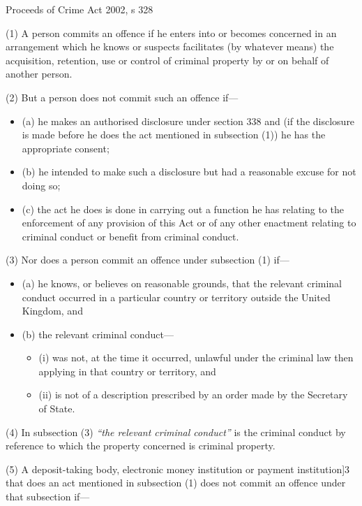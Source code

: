 \documentclass[
]{article}
\newenvironment{env-28b706cc-8a08-422f-af86-ede86c79505b}
{
    \savenotes\tcolorbox[blanker,breakable,left=5pt,borderline west={2pt}{-4pt}{green}]
}
{
    \endtcolorbox\spewnotes
}
\begin{document}
\begin{env-28b706cc-8a08-422f-af86-ede86c79505b}

Proceeds of Crime Act 2002, s 328

(1) A person commits an offence if he enters into or becomes concerned
in an arrangement which he knows or suspects facilitates (by whatever
means) the acquisition, retention, use or control of criminal property
by or on behalf of another person.

(2) But a person does not commit such an offence if---

\begin{itemize}
\item
  (a) he makes an authorised disclosure under section 338 and (if the
  disclosure is made before he does the act mentioned in subsection (1))
  he has the appropriate consent;
\item
  (b) he intended to make such a disclosure but had a reasonable excuse
  for not doing so;
\item
  (c) the act he does is done in carrying out a function he has relating
  to the enforcement of any provision of this Act or of any other
  enactment relating to criminal conduct or benefit from criminal
  conduct.
\end{itemize}

(3) Nor does a person commit an offence under subsection (1) if---

\begin{itemize}
\item
  (a) he knows, or believes on reasonable grounds, that the relevant
  criminal conduct occurred in a particular country or territory outside
  the United Kingdom, and
\item
  (b) the relevant criminal conduct---

  \begin{itemize}
  \item
    (i) was not, at the time it occurred, unlawful under the criminal
    law then applying in that country or territory, and
  \item
    (ii) is not of a description prescribed by an order made by the
    Secretary of State.
  \end{itemize}
\end{itemize}

(4) In subsection (3) \emph{``the relevant criminal conduct''} is the
criminal conduct by reference to which the property concerned is
criminal property.

(5) A deposit-taking body, electronic money institution or payment
institution{]}3 that does an act mentioned in subsection (1) does not
commit an offence under that subsection if---


\end{env-28b706cc-8a08-422f-af86-ede86c79505b}
\end{document}

